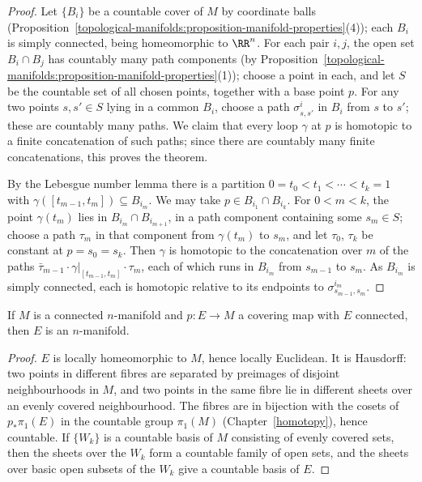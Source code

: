 \begin{proof}
Let $\{B_i\}$ be a countable cover of $M$ by coordinate balls (Proposition~\ref{topological-manifolds:proposition-manifold-properties}(4)); each $B_i$ is simply connected, being homeomorphic to $\RR^n$. For each pair $i, j$, the open set
$B_i \cap B_j$ has countably many path components (by Proposition~\ref{topological-manifolds:proposition-manifold-properties}(1)); choose a point in each, and let $S$ be the countable set of all chosen points, together with a
base point $p$. For any two points $s, s' \in S$ lying in a common $B_i$, choose a path $\sigma^i_{s,s'}$ in $B_i$ from $s$ to $s'$; these are countably many paths. We claim that every loop $\gamma$ at $p$ is homotopic to a finite
concatenation of such paths; since there are countably many finite concatenations, this proves the theorem.

By the Lebesgue number lemma there is a partition $0 = t_0 < t_1 < \cdots < t_k = 1$ with $\gamma([t_{m-1}, t_m]) \subseteq B_{i_m}$. We may take $p \in B_{i_1} \cap B_{i_k}$. For $0 < m < k$, the point $\gamma(t_m)$ lies in
$B_{i_m} \cap B_{i_{m+1}}$, in a path component containing some $s_m \in S$; choose a path $\tau_m$ in that component from $\gamma(t_m)$ to $s_m$, and let $\tau_0$, $\tau_k$ be constant at $p = s_0 = s_k$. Then $\gamma$ is homotopic to
the concatenation over $m$ of the paths $\bar\tau_{m-1} \cdot \gamma|_{[t_{m-1},t_m]} \cdot \tau_m$, each of which runs in $B_{i_m}$ from $s_{m-1}$ to $s_m$. As $B_{i_m}$ is simply connected, each is homotopic relative to its
endpoints to $\sigma^{i_m}_{s_{m-1},s_m}$.
\end{proof}

\begin{corollary}\label{topological-manifolds:corollary-covering-manifold}
If $M$ is a connected $n$-manifold and $p \colon E \to M$ a covering map with $E$ connected, then $E$ is an $n$-manifold.
\end{corollary}

\begin{proof}
$E$ is locally homeomorphic to $M$, hence locally Euclidean. It is Hausdorff: two points in different fibres are separated by preimages of disjoint neighbourhoods in $M$, and two points in the same fibre lie in different
sheets over an evenly covered neighbourhood. The fibres are in bijection with the cosets of $p_*\pi_1(E)$ in the countable group $\pi_1(M)$ (Chapter~\ref{homotopy}), hence countable. If $\{W_k\}$ is a countable basis of $M$
consisting of evenly covered sets, then the sheets over the $W_k$ form a countable family of open sets, and the sheets over basic open subsets of the $W_k$ give a countable basis of $E$.
\end{proof}

